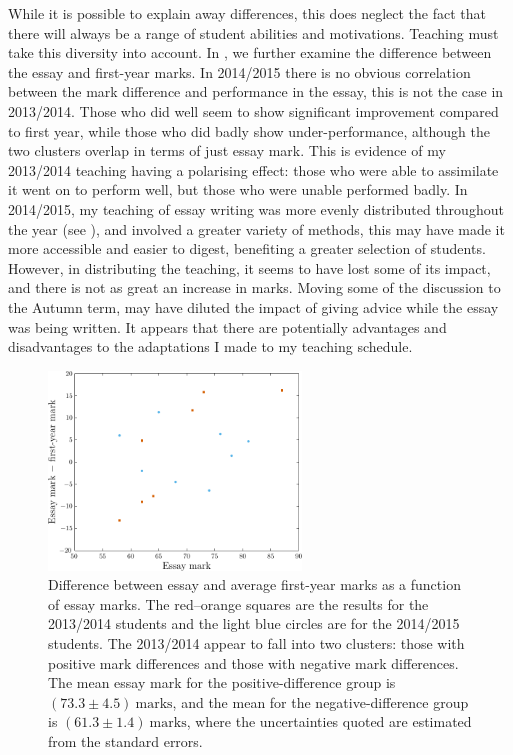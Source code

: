 While it is possible to explain away differences, this does neglect the fact that there will always be a range of student abilities and motivations. Teaching must take this diversity into account. In , we further examine the difference between the essay and first-year marks. In 2014/2015 there is no obvious correlation between the mark difference and performance in the essay, this is not the case in 2013/2014. Those who did well seem to show significant improvement compared to first year, while those who did badly show under-performance, although the two clusters overlap in terms of just essay mark. This is evidence of my 2013/2014 teaching having a polarising effect: those who were able to assimilate it went on to perform well, but those who were unable performed badly. In 2014/2015, my teaching of essay writing was more evenly distributed throughout the year (see ), and involved a greater variety of methods, this may have made it more accessible and easier to digest, benefiting a greater selection of students. However, in distributing the teaching, it seems to have lost some of its impact, and there is not as great an increase in marks. Moving some of the discussion to the Autumn term, may have diluted the impact of giving advice while the essay was being written. It appears that there are potentially advantages and disadvantages to the adaptations I made to my teaching schedule.
\begin{figure}
  \centering
   \includegraphics[width=0.6\textwidth]{./figs/Fig_mark_mark_diff}
\caption{Difference between essay and average first-year marks as a function of essay marks. The red--orange squares are the results for the 2013/2014 students and the light blue circles are for the 2014/2015 students. The 2013/2014 appear to fall into two clusters: those with positive mark differences and those with negative mark differences. The mean essay mark for the positive-difference group is $(73.3\pm4.5)~\mathrm{marks}$, and the mean for the negative-difference group is $(61.3\pm1.4)~\mathrm{marks}$, where the uncertainties quoted are estimated from the standard errors.}
  \label{fig:mark-mark-diff}
\end{figure}

